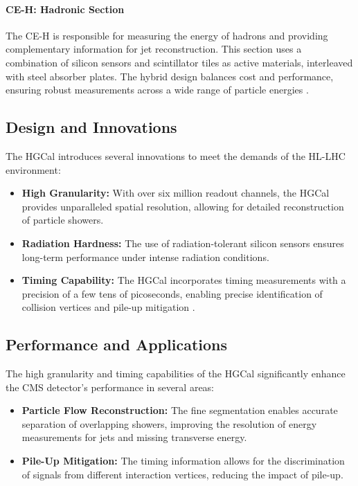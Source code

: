 \paragraph{CE-H: Hadronic Section}
The CE-H is responsible for measuring the energy of hadrons and providing complementary information for jet reconstruction. This section uses a combination of silicon sensors and scintillator tiles as active materials, interleaved with steel absorber plates. The hybrid design balances cost and performance, ensuring robust measurements across a wide range of particle energies \cite{hgcal_tdr}.

\subsection{Design and Innovations}

The HGCal introduces several innovations to meet the demands of the HL-LHC environment:
\begin{itemize}
    \item \textbf{High Granularity:} With over six million readout channels, the HGCal provides unparalleled spatial resolution, allowing for detailed reconstruction of particle showers.
    \item \textbf{Radiation Hardness:} The use of radiation-tolerant silicon sensors ensures long-term performance under intense radiation conditions.
    \item \textbf{Timing Capability:} The HGCal incorporates timing measurements with a precision of a few tens of picoseconds, enabling precise identification of collision vertices and pile-up mitigation \cite{hgcal_tdr}.
\end{itemize}

\subsection{Performance and Applications}

The high granularity and timing capabilities of the HGCal significantly enhance the CMS detector's performance in several areas:
\begin{itemize}
    \item \textbf{Particle Flow Reconstruction:} The fine segmentation enables accurate separation of overlapping showers, improving the resolution of energy measurements for jets and missing transverse energy.
    \item \textbf{Pile-Up Mitigation:} The timing information allows for the discrimination of signals from different interaction vertices, reducing the impact of pile-up.
\end{itemize}

